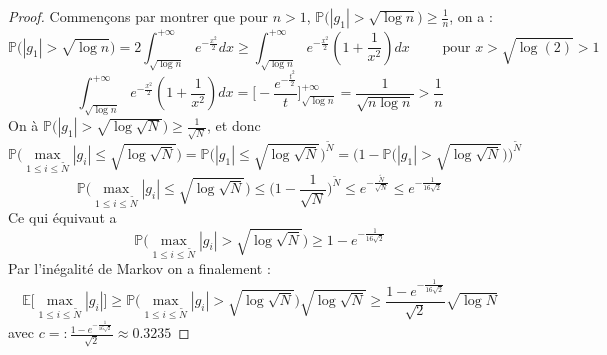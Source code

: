 \documentclass[12pt]{article}
\begin{document}
\begin{proof}
	Commençons par montrer que pour $n>1$, $\mathbb{P}\big(|g_1|> \sqrt{\log n}\big) \geq \frac{1}{n}$, on a :
	\begin{equation*}
		\mathbb{P}\big(|g_1|> \sqrt{\log n}\big) = 2 \int_{\sqrt{\log n}}^{+\infty}e^{-\frac{x^2}{2}}dx\geq \int_{\sqrt{\log n}}^{+\infty}e^{-\frac{x^2}{2}}(1+\frac{1}{x^2})dx  \qquad \text{ pour $x>\sqrt{\log(2)}>1$}
	\end{equation*}
	\begin{equation*}
		\int_{\sqrt{\log n}}^{+\infty}e^{-\frac{x^2}{2}}(1+\frac{1}{x^2})dx = \Big[-\frac{ e^{-\frac{t^2}{2}}}{t}\Big]_{\sqrt{\log n}}^{+\infty}=\frac{1}{\sqrt{n\log n}}>\frac{1}{n}
	\end{equation*}
	On à $\mathbb{P}\big(|g_1|> \sqrt{\log \sqrt{N}}\big)\geq \frac{1}{\sqrt{N}}$, et donc 
	\begin{equation*}
		 \mathbb{P}\Big(\max_{1 \leq i\leq \tilde{N}}|g_i|\leq \sqrt{\log \sqrt{N}}\Big) = \mathbb{P}\Big(|g_1|\leq \sqrt{\log \sqrt{N}}\Big)^{\tilde{N}}=\Bigg(1-\mathbb{P}\Big(|g_1|> \sqrt{\log \sqrt{N}}\Big)\Bigg)^{\tilde{N}}
	\end{equation*}
	\begin{equation*}
		\mathbb{P}\Big(\max_{1 \leq i\leq \tilde{N}}|g_i|\leq \sqrt{\log \sqrt{N}}\Big)\leq \Bigg(1-\frac{1}{\sqrt{N}}\Bigg)^{\tilde{N}}\leq e^{-\frac{\tilde{N}}{\sqrt{N}}} \leq e^{-\frac{1}{16\sqrt{2}}}
	\end{equation*}
	Ce qui équivaut a 
	\begin{equation*}
		\mathbb{P}\Big(\max_{1 \leq i\leq \tilde{N}}|g_i|> \sqrt{\log \sqrt{N}}\Big)\geq 1- e^{-\frac{1}{16\sqrt{2}}}
	\end{equation*}
	Par l'inégalité de Markov on a finalement :
	\begin{equation*}
		\mathbb{E}\big[\max_{1 \leq i\leq \tilde{N}}|g_i|\big]\geq \mathbb{P}\Big(\max_{1 \leq i\leq \tilde{N}}|g_i|> \sqrt{\log \sqrt{N}}\Big) \sqrt{\log \sqrt{N}}\geq \frac{1- e^{-\frac{1}{16\sqrt{2}}}}{\sqrt{2}}\sqrt{\log N}
	\end{equation*}
	avec $c =: \frac{1- e^{-\frac{1}{16\sqrt{2}}}}{\sqrt{2}}\approx 0.3235 $ 
\end{proof}
\end{document}
